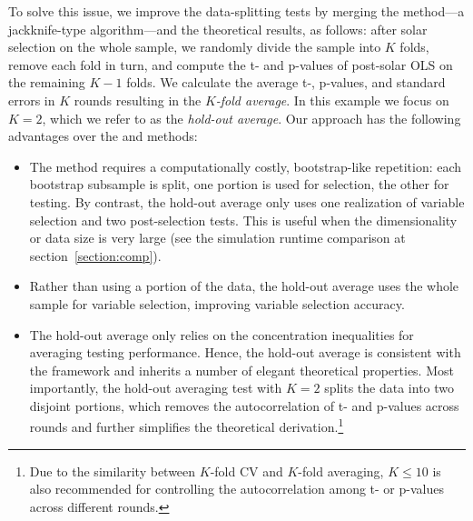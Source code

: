 \documentclass[11pt,review,authoryear]{elsarticle}
\begin{document}
To solve this issue, we improve the data-splitting tests by merging the \citet{bousquet2002stability} method---a jackknife-type algorithm---and the \citet{diciccio2020exact} theoretical results, as follows: after solar selection on the whole sample, we randomly divide the sample into $K$ folds, remove each fold in turn, and compute the t- and p-values of post-solar OLS on the remaining $K-1$ folds. We calculate the average t-, p-values, and standard errors in $K$ rounds resulting in the \emph{$K$-fold average}. In this example we focus on $K=2$, which we refer to as the \emph{hold-out average}. Our approach has the following advantages over the \citet{wasserman2009high} and \citet{meinshausen2009p} methods:

\begin{itemize}
  \item The \citet{meinshausen2009p} method requires a computationally costly, bootstrap-like repetition: each bootstrap subsample is split, one portion is used for selection, the  other for testing. By contrast, the hold-out average only uses one realization of variable selection and two post-selection tests. This is useful when the dimensionality or data size is very large (see the simulation runtime comparison at section~\ref{section:comp}).
  \item Rather than using a portion of the data, the hold-out average uses the whole sample for variable selection, improving variable selection accuracy.
  \item The hold-out average only relies on the concentration inequalities for averaging testing performance. Hence, the hold-out average is consistent with the \citet{diciccio2020exact} framework and inherits a number of elegant theoretical properties. Most importantly, the hold-out averaging test with $K=2$ splits the data into two disjoint portions, which removes the autocorrelation of t- and p-values across rounds and further simplifies the \citet{diciccio2020exact} theoretical derivation.\footnote{Due to the similarity between $K$-fold CV and $K$-fold averaging, $K \leqslant 10$ \citep{friedman2001elements} is also recommended for controlling the autocorrelation among t- or p-values across different rounds.}
\end{itemize}
\end{document}
